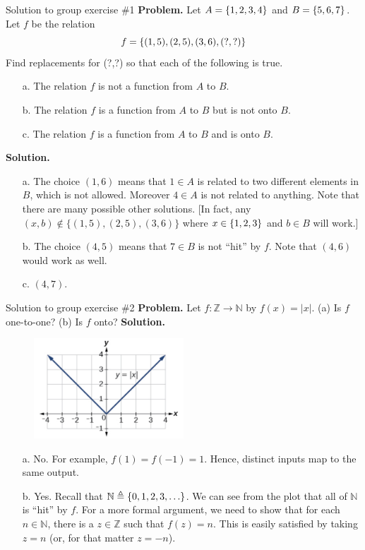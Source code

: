 \documentclass[10pt]{beamer}
\begin{document}
\begin{frame}{Solution to group exercise \#1}
\textbf{Problem.}  Let $A =\{ {1,2,3,4} \}$ and $B=\{ {5,6,7} \}$.  Let $f$ be the relation
	\[  f=\{ {(1,5),(2,5), (3,6),(?,?)} \}\]
	Find replacements for (?,?) so that each of the following is true.
	\begin{itemize} 
		\item [a.] The relation $f$ is not a function from $A$ to $B$.
		\item [b.] The relation $f$ is a function from $A$ to $B$ but is not onto $B$.
		\item [c.] The relation $f$ is a function from $A$ to $B$ and is onto $B$.
	\end{itemize}
\vfill 
\textbf{Solution.} 
	\begin{itemize} 
		\item [a.] The choice $(1,6)$ means that $1 \in A$ is related to two different elements in $B$, which is not allowed.  Moreover $4 \in A$ is not related to anything.  Note that there are many possible other solutions. [In fact, any $(x,b) \not\in \big\{(1,5),(2,5), (3,6) \big\}$  where $x \in \{ {1,2,3} \}$ and $b \in B$ will work.]
		\item [b.] The choice $(4,5)$ means that $7 \in B$ is not \enquote{hit} by $f$.   Note that $(4,6)$ would work as well.
		\item [c.] $(4,7)$. 
	\end{itemize}

\end{frame}




\begin{frame}{Solution to group exercise \#2}
\footnotesize 
\textbf{Problem.} Let $f: \mathbb{Z} \to \mathbb{N}$ by $f(x)=|x|$.   (a) Is $f$ one-to-one? (b) Is $f$ onto?
\vfill 
\textbf{Solution.}

\begin{figure}
\includegraphics[width=0.5\textwidth]{images/abs_value.png}	
\end{figure}

	\begin{itemize} \footnotesize  
		\item [a.] No. For example, $f(1) = f(-1) = 1$.  Hence, distinct inputs map to the same output.
		\item [b.] Yes.  Recall that $\mathbb{N} \triangleq \{ {0,1,2,3, \hdots} \}$. We can see from the plot that all of $\mathbb{N}$ is \enquote{hit} by $f$.  For a more formal argument, we need to show that for each $n \in \mathbb{N}$, there is a $z \in \mathbb{Z}$  such that $f(z)=n$. This is easily satisfied by taking $z=n$ (or, for that matter $z=-n$).
	\end{itemize}

\end{frame}
\end{document}
